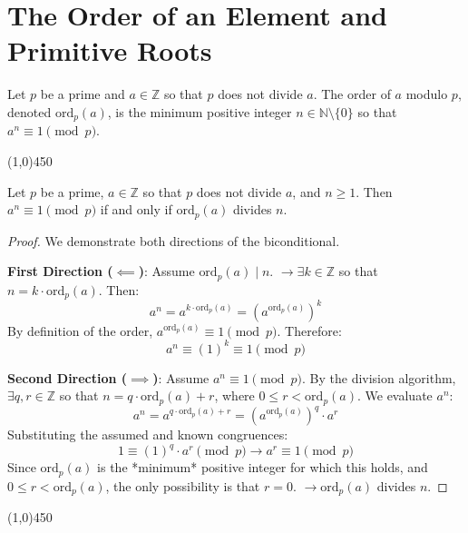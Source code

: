 \section{The Order of an Element and Primitive Roots}

\begin{definition}
Let $p$ be a prime and $a \in \mathbb{Z}$ so that $p$ does not divide $a$. The order of $a$ modulo $p$, denoted $\text{ord}_p(a)$, is the minimum positive integer $n \in \mathbb{N} \setminus \{0\}$ so that $a^n \equiv 1 \pmod{p}$.
\end{definition}

\begin{center}
    \vspace{10pt}
    \line(1,0){450}
    \vspace{25pt}
\end{center}

\begin{proposition}
Let $p$ be a prime, $a \in \mathbb{Z}$ so that $p$ does not divide $a$, and $n \ge 1$. Then $a^n \equiv 1 \pmod{p}$ if and only if $\text{ord}_p(a)$ divides $n$.
\end{proposition}
\begin{proof}
We demonstrate both directions of the biconditional.

\textbf{First Direction ($\impliedby$)}: Assume $\text{ord}_p(a) \mid n$.
$\rightarrow \exists k \in \mathbb{Z}$ so that $n = k \cdot \text{ord}_p(a)$.
Then:
$$
a^n = a^{k \cdot \text{ord}_p(a)} = (a^{\text{ord}_p(a)})^k
$$
By definition of the order, $a^{\text{ord}_p(a)} \equiv 1 \pmod{p}$. Therefore:
$$
a^n \equiv (1)^k \equiv 1 \pmod{p}
$$

\textbf{Second Direction ($\implies$)}: Assume $a^n \equiv 1 \pmod{p}$.
By the division algorithm, $\exists q, r \in \mathbb{Z}$ so that $n = q \cdot \text{ord}_p(a) + r$, where $0 \le r < \text{ord}_p(a)$.
We evaluate $a^n$:
$$
a^n = a^{q \cdot \text{ord}_p(a) + r} = (a^{\text{ord}_p(a)})^q \cdot a^r
$$
Substituting the assumed and known congruences:
$$
1 \equiv (1)^q \cdot a^r \pmod{p} \rightarrow a^r \equiv 1 \pmod{p}
$$
Since $\text{ord}_p(a)$ is the *minimum* positive integer for which this holds, and $0 \le r < \text{ord}_p(a)$, the only possibility is that $r = 0$.
$\rightarrow \text{ord}_p(a)$ divides $n$.
\end{proof}

\begin{center}
    \vspace{10pt}
    \line(1,0){450}
    \vspace{25pt}
\end{center}

